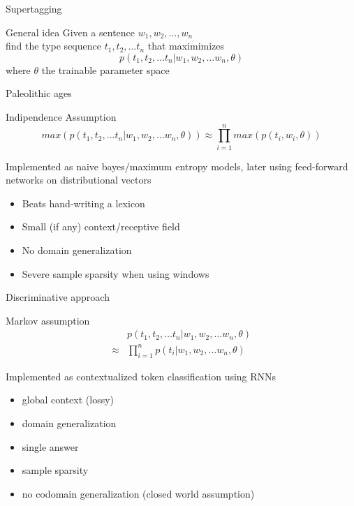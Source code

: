 \documentclass{beamer}
\begin{document}
\begin{frame}{Supertagging}
	\small
	
	\begin{block}{General idea}
		Given a sentence $w_1, w_2, \dots , w_n$\\
		\quad find the type sequence $t_1, t_2, \dots t_n$ that maximimizes
		\[
			p(t_1, t_2, \dots t_n | w_1, w_2, \dots w_n, \theta)
		\]
		where $\theta$ the trainable parameter space
	\end{block}
\end{frame}

\begin{frame}{Paleolithic ages}
	\small 
	\begin{block}{Indipendence Assumption}
	\[
		max(	p(t_1, t_2, \dots t_n | w_1, w_2, \dots w_n, \theta)) \approx \prod_{i=1}^{n} max(p(t_i, w_i, \theta))
	\]
	\end{block}

	Implemented as naive bayes/maximum entropy models, later using feed-forward networks on distributional vectors
	\begin{itemize}
		\item[\smiley] Beats hand-writing a lexicon
		\item[\frownie] Small (if any) context/receptive field
		\item[\frownie] No domain generalization 
		\item[\frownie] Severe sample sparsity when using windows
	\end{itemize}

\end{frame}

\begin{frame}{Discriminative approach}
	\small
	
	\begin{block}{Markov assumption}
		\begin{align*}
			& p(t_1, t_2, \dots t_n | w_1, w_2, \dots w_n, \theta) \\
			\approx &
			\prod_{i=1}^{n} p(t_i | w_1, w_2, \dots w_n, \theta)
		\end{align*}
	\end{block}
	
	Implemented as contextualized token classification using RNNs
	\begin{itemize}
		\item[\smiley] 			global context (lossy)
		\item[\smiley] 			domain generalization
		\item[\alert{\frownie}]	single answer
		\item[\alert{\frownie}]	sample sparsity
		\item[\alert{\frownie}]  no codomain generalization (closed world assumption)
	\end{itemize}
\end{frame}
\end{document}
